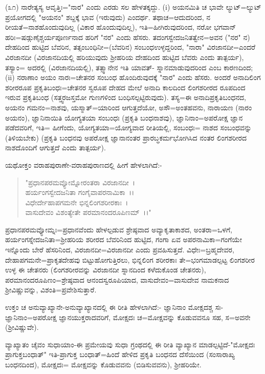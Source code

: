 (೩೧) ನಾರೇತ್ಯಸ್ಯ ಆವೃತ್ತಿಃ="ನಾರ" ಎಂದು ಎರಡು ಸಲ ಹೇಳತಕ್ಕದ್ದು. (i) ಅಯನಮಿತಿ ಚ ಭಾವೇ ಲ್ಯುಟ್=ಲ್ಯುಟ್ ಪ್ರಯೋಗದಲ್ಲಿ "ಅಯನಂ" ಶಬ್ದಕ್ಕೆ ಭಾವ (ಇರುವುದು) ಎಂದರ್ಥ. ತಥಾಚ=ಆದುದರಿಂದ, ನ ರೀಯತೆ=ನಾಶಹೊಂದುವುದಿಲ್ಲ (ವಿಕಾರ ಹೊಂದುವುದಿಲ್ಲ), ಇತಿ=ಹೀಗಿರುವುದರಿಂದ, ನರೋ ಭಗವಾನ್ ಹರಿಃ=ಷಡ್ಗುಣೈಶ್ಚರ್ಯಪೂರ್ಣನಾದ ಹರಿಗೆ "ನರ" ಎಂದು ಹೆಸರು. ತದಂಗಸ್ವೇದಜನಿತತ್ವೇನ=ಅವನ ("ನರ" ನ) ದೇಹದಿಂದ ಹುಟ್ಟಿದ ಬೆವರಿನ, ತತ್ಸಂಬಂಧಿನೀ=(ಬೆವರಿನ) ಸಂಬಂಧಉಳ್ಳದ್ದರಿಂದ, "ನಾರಾ" ವಿರಜಾನದೀ=ಎಂದರೆ ವಿರಜಾನದೀ (ವಿರಜಾನದಿಯಲ್ಲಿ ಹರಿಯುವುದು ಶ‍್ರೀಹರಿಯ ದೇಹದಿಂದ ಹುಟ್ಟಿದ ಬೆವರು ಎಂದು ತಾತ್ಪರ್ಯ), ತಸ್ಯಾಂ= ಅದರಲ್ಲಿ (ವಿರಜಾನದಿಯಲ್ಲಿ), ತತ್ಸ್ವಾನೇನ ಇತಿ ಯಾವತ್- ಸ್ನಾನಮಾಡುವುದರಿಂದ ಎಂಬ ಕಾರಣದಿಂದ; (ii) ನರಾಣಾಂ ಅಯಂ ನಾರಃ=ಚೇತನರ ಸಂಬಂಧ ಹೊಂದಿರುವುದಕ್ಕೆ "ನಾರ" ಎಂದು ಹೆಸರು. ಅಂದರೆ ಅನಾದಿಲಿಂಗ ಶರೀರರೂಪ ಪ್ರಕೃತಿಬಂಧಃ=ಚೇತನರ ಸ್ವರೂಪ ದೇಹದ ಮೇಲೆ ಅನಾದಿ ಕಾಲದಿಂದ ಲಿಂಗಶರೀರದ ರೂಪದಿಂದ ಇರುವ ಪ್ರಕೃತಿಬಂಧ (ಸತ್ತ್ವರಜಸ್ತಮೋ ಗುಣಗಳಿಂದ ಬಂಧಿಸಲ್ಪಟ್ಟಿರುವುದು). ತಸ್ಯ=ಈ ಅನಾದಿಪ್ರಕೃತಿಬಂಧನದ, ಅಯನಂ ಗಮನಂ=ನಾಶವು, ಯಸ್ಮಾತ್=ಯಾರಿಂದ ಆಗುತ್ತದೆಯೋ, ಅಸೌ=ಅಂತಹವನು, ನಾರಾಯಣ (ನಾರಂ ಅಯನಂ), ಜ್ಞಾನಿನಾಯಿತಿ ಯೋಗ್ಯತಯಾ ಸಂಬಂಧಃ (ಪ್ರಕೃತಿ ಬಂಧನಾಶವು), ಜ್ಞಾನಿನಾಂ=ಅಪರೋಕ್ಷ ಜ್ಞಾನ ಪಡೆದವರಿಗೆ, ಇತಿ= ಹೀಗೆಂದು, ಯೋಗ್ಯತಯಾ=ಯೋಗ್ಯವಾದ ರೀತಿಯಲ್ಲಿ, ಸಂಬಂಧಃ= ನಾಶದ ಸಂಬಂಧವನ್ನು (ತಿಳಿಯಬೇಕು) (ಪ್ರಕೃತಿ ಬಂಧನವು ಅಪರೋಕ್ಷ ಜ್ಞಾನಾನಂತರ ಪ್ರಾರಬ್ಧಕರ್ಮಭೋಗಿಸಿದ ನಂತರ ಲಿಂಗಶರೀರದ ನಾಶದೊಂದಿಗೆ ಆಗುತ್ತದೆ ಎಂದು ತಾತ್ಪರ್ಯ).

ಯಥೋಕ್ತಂ ವರಾಹಪುರಾಣೇ-ವರಾಹಪುರಾಣದಲ್ಲಿ ಹೀಗೆ ಹೇಳಲಾಗಿದೆ:-

\begin{verse}
"ಪ್ರಧಾನಪರಮವ್ಯೋಮ್ನೋರಂತರಾ ವಿರಜಾನದೀ~।\\ ಹರ್ಯಂಗಸ್ವೇದಜನಿತಾ ಗಂಗೈವಾಪರನಾಮಿಕಾ~।।\\ ವಿಧೇರ್ದೇಹಾಪಗಮನೇ ಭಿನ್ನಲಿಂಗಶರೀರಕಾಃ~।\\ ವಾಸುದೇವಂ ವಿಶಂತ್ಯೇತೇ ಪರಮಾನಂದರೂಪಿಣಮ್~।।"
\end{verse}

ಪ್ರಧಾನಪರಮವ್ಯೋಮ್ನಃ=ಪ್ರಧಾನವೆಂದು ಹೇಳಲ್ಪಡುವ ಶ್ರೇಷ್ಠವಾದ ಅವ್ಯಾಕೃತಾಕಾಶದ, ಅಂತರಾ=ಒಳಗೆ, ಹರ್ಯಂಗಸ್ನೇದಜನಿತಾ=ಶ‍್ರೀಹರಿಯ ಶರೀರದ ಬೆವರಿನಿಂದ ಹುಟ್ಟಿದ, ಗಂಗಾ ಏವ ಅಪರನಾಮಿಕಾ=ಗಂಗೆಯೇ ಇನ್ನೊಂದು ಬೇರೆ ಹೆಸರಿನಿಂದ, ವಿರಜಾನದೀ=ವಿರಜಾನದೀ ಎಂದು ಪ್ರವಹಿಸುತ್ತದೆ. ವಿಧೇಃ=ಬ್ರಹ್ಮದೇವರ, ದೇಹಾಪಗಮನೇ=ಪ್ರಾಕೃತದೇಹವು ಬಿಟ್ಟುಹೋಗುತ್ತಿರಲು, ಭಿನ್ನಲಿಂಗ ಶರೀರಕಾಃ ತೇ=ಭಂಗಮಾಡಲ್ಪಟ್ಟ ಲಿಂಗಶರೀರ ಉಳ್ಳ ಈ ಚೇತನರು (ಲಿಂಗಶರೀರವನ್ನು ವಿರಜಾನದೀ ಸ್ನಾನದಿಂದ ಕಳೆದುಕೊಂಡ ಚೇತನರು), ಪರಮಾನಂದರೂಪಿಣಂ=ಶ್ರೇಷ್ಠವಾದ ಆನಂದಸ್ವರೂಪಿಯಾದ, ವಾಸುದೇವಂ=ವಾಸುದೇವ ನಾಮಕನಾದ ಶ‍್ರೀವಿಷ್ಣುವನ್ನು, ವಿಶಂತಿ=ಪ್ರವೇಶಿಸುತ್ತಾರೆ.

ಉಕ್ತಂ ಚ ಅನುವ್ಯಾಖ್ಯಾನೇ-ಅನುವ್ಯಾಖ್ಯಾನದಲ್ಲಿ ಈ ರೀತಿ ಹೇಳಲಾಗಿದೆ:- ಜ್ಞಾನಿನಾಂ ಮೋಕ್ಷದಶ್ಚ ಸಃ- ಜ್ಞಾನಿನಾಂ=ಅಪರೋಕ್ಷ ಜ್ಞಾನಯುಕ್ತರಾದವರಿಗೆ, ಮೋಕ್ಷದಃ ಚ=ಮೋಕ್ಷವನ್ನು ಕೊಡುವವನೂ ಸಹ, ಸ=ಅವನೇ (ಶ‍್ರೀವಿಷ್ಣುವೇ).

ವ್ಯಾಖ್ಯಾತಂ ಚೈವಂ ಸುಧಾಯಾಂ-ಈ ಪ್ರಮೇಯವು ಸುಧಾ ಗ್ರಂಥದಲ್ಲಿ ಈ ರೀತಿ ವ್ಯಾಖ್ಯಾನ ಮಾಡಲ್ಪಟ್ಟಿದೆ-"ಮೋಕ್ಷದಃ ಪ್ರಾಗುಕ್ತಬಂಧಾತ್" ಇತಿ-ಪ್ರಾಗುಕ್ತ ಬಂಧಾತ್=ಹಿಂದೆ ಹೇಳಿದ ಪ್ರಕೃತಿ ಬಂಧನದ ದೆಸೆಯಿಂದ (ಸಂಸಾರಾಖ್ಯ ಬಂಧನದಿಂದ), ಮೋಕ್ಷದಃ= ಮೋಕ್ಷವನ್ನು ಕೊಡುವವನು (ಬಿಡಿಸುವವನು), ಶ‍್ರೀಹರಿಯೇ.

